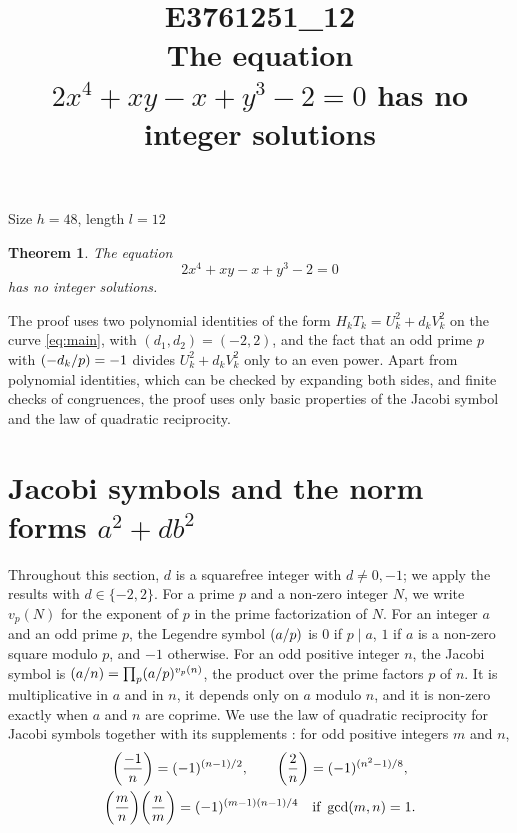 \documentclass[11pt]{article}
\title{\textbf{E3761251\_12}\\[4pt] {\Large The equation $2x^{4}+xy-x+y^{3}-2=0$ has no integer solutions}}
\author{}
\date{}
\newtheorem{theorem}{Theorem}
\newcommand{\leg}[2]{\mathchoice{\biggl(\dfrac{#1}{#2}\biggr)}{(#1/#2)}{(#1/#2)}{(#1/#2)}}
\begin{document}
\maketitle
\vspace{-8ex}
\begin{center}
Size $h=48$, length $l=12$
\end{center}

\begin{theorem}\label{thm:main}
The equation
\begin{equation}\label{eq:main}
2x^{4}+xy-x+y^{3}-2=0
\end{equation}
has no integer solutions.
\end{theorem}

The proof uses two polynomial identities of the form $H_kT_k=U_k^2+d_kV_k^2$ on the curve \eqref{eq:main}, with $(d_1,d_2)=(-2,2)$, and the fact that an odd prime $p$ with $\leg{-d_k}{p}=-1$ divides $U_k^2+d_kV_k^2$ only to an even power. Apart from polynomial identities, which can be checked by expanding both sides, and finite checks of congruences, the proof uses only basic properties of the Jacobi symbol and the law of quadratic reciprocity.

\section{Jacobi symbols and the norm forms $a^2+db^2$}

Throughout this section, $d$ is a squarefree integer with $d\neq0,-1$; we apply the results with $d\in\{-2,2\}$. For a prime $p$ and a non-zero integer $N$, we write $v_p(N)$ for the exponent of $p$ in the prime factorization of $N$. For an integer $a$ and an odd prime $p$, the Legendre symbol $\leg{a}{p}$ is $0$ if $p\mid a$, $1$ if $a$ is a non-zero square modulo $p$, and $-1$ otherwise. For an odd positive integer $n$, the Jacobi symbol is $\leg{a}{n}=\prod_p\leg{a}{p}^{v_p(n)}$, the product over the prime factors $p$ of $n$. It is multiplicative in $a$ and in $n$, it depends only on $a$ modulo $n$, and it is non-zero exactly when $a$ and $n$ are coprime. We use the law of quadratic reciprocity for Jacobi symbols together with its supplements \cite[Chapter~5, \S2]{IR}: for odd positive integers $m$ and $n$,
\begin{gather*}
\leg{-1}{n}=(-1)^{(n-1)/2},\qquad\leg{2}{n}=(-1)^{(n^2-1)/8},\\
\leg{m}{n}\leg{n}{m}=(-1)^{(m-1)(n-1)/4}\quad\text{if }\gcd(m,n)=1.
\end{gather*}
\end{document}

